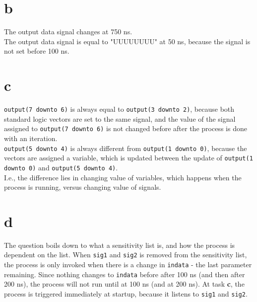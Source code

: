     \section*{b}
        The output data signal changes at 750 ns. \\
        The output data signal is equal to "UUUUUUUU" at 50 ns, because the signal is not set before 100 ns.

    \section*{c}
        \texttt{output(7 downto 6)} is always equal to \texttt{output(3 downto 2)}, because both standard logic vectors are set to the same signal, and the value of the signal assigned to \texttt{output(7 downto 6)} is not changed before after the process is done with an iteration. \\
        \texttt{output(5 downto 4)} is always different from \texttt{output(1 downto 0)}, because the vectors are assigned a variable, which is updated between the update of \texttt{output(1 downto 0)} and \texttt{output(5 downto 4)}. \\
        I.e., the difference lies in changing value of variables, which happens when the process is running, versus changing value of signals. 

    \section*{d}
        The question boils down to what a sensitivity list is, and how the process is dependent on the list. When \texttt{sig1} and \texttt{sig2} is removed from the sensitivity list, the process is only invoked when there is a change in \texttt{indata} - the last parameter remaining. Since nothing changes to \texttt{indata} before after 100 ns (and then after 200 ns), the process will not run until at 100 ns (and at 200 ns). At task \textbf{c}, the process is triggered immediately at startup, because it listens to \texttt{sig1} and \texttt{sig2}.

